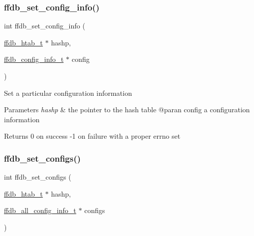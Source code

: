 \subsubsection{\texorpdfstring{ffdb\_set\_config\_info()}{ffdb\_set\_config\_info()}}
{\footnotesize\ttfamily int ffdb\+\_\+set\+\_\+config\+\_\+info (\begin{DoxyParamCaption}\item[{\mbox{\hyperlink{adat-devel_2other__libs_2filedb_2filehash_2ffdb__hash_8h_ae592010ed2bedc975d3cc0b7d074b9d1}{ffdb\+\_\+htab\+\_\+t}} $\ast$}]{hashp,  }\item[{\mbox{\hyperlink{adat-devel_2other__libs_2filedb_2filehash_2ffdb__db_8h_acc961fbd2faf6a849a1620309100fda1}{ffdb\+\_\+config\+\_\+info\+\_\+t}} $\ast$}]{config }\end{DoxyParamCaption})}

Set a particular configuration information 
\begin{DoxyParams}{Parameters}
{\em hashp} & the pointer to the hash table @paran config a configuration information\\
\hline
\end{DoxyParams}
\begin{DoxyReturn}{Returns}
0 on success -\/1 on failure with a proper errno set 
\end{DoxyReturn}
\mbox{\label{adat-devel_2other__libs_2filedb_2filehash_2ffdb__hash_8h_a57a72b4c0d4aaeef58f11a8c96f5b572}} 
\subsubsection{\texorpdfstring{ffdb\_set\_configs()}{ffdb\_set\_configs()}}
{\footnotesize\ttfamily int ffdb\+\_\+set\+\_\+configs (\begin{DoxyParamCaption}\item[{\mbox{\hyperlink{adat-devel_2other__libs_2filedb_2filehash_2ffdb__hash_8h_ae592010ed2bedc975d3cc0b7d074b9d1}{ffdb\+\_\+htab\+\_\+t}} $\ast$}]{hashp,  }\item[{\mbox{\hyperlink{adat-devel_2other__libs_2filedb_2filehash_2ffdb__db_8h_afc17234e7cd387e11de55b92df6bb0e5}{ffdb\+\_\+all\+\_\+config\+\_\+info\+\_\+t}} $\ast$}]{configs }\end{DoxyParamCaption})}

